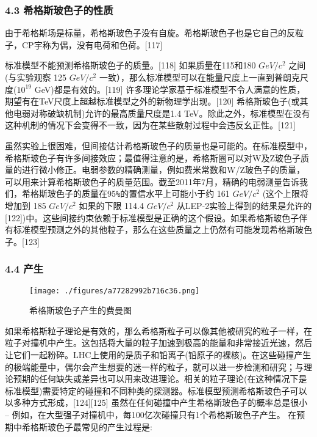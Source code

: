 \subsubsection{4.3 希格斯玻色子的性质}

由于希格斯场是标量，希格斯玻色子没有自旋。希格斯玻色子也是它自己的反粒子，CP宇称为偶，没有电荷和色荷。[117]

标准模型不能预测希格斯玻色子的质量。[118] 如果质量在115和180 $GeV/c^2$ 之间(与实验观察 125 $GeV/c^2$ 一致），那么标准模型可以在能量尺度上一直到普朗克尺度($10^{19}$ GeV)都是有效的。[119] 许多理论学家基于标准模型不令人满意的性质，期望有在TeV尺度上超越标准模型之外的新物理学出现。[120] 希格斯玻色子(或其他电弱对称破缺机制)允许的最高质量尺度是1.4 TeV。除此之外，标准模型在没有这种机制的情况下会变得不一致，因为在某些散射过程中会违反幺正性。[121]

虽然实验上很困难，但间接估计希格斯玻色子的质量也是可能的。在标准模型中，希格斯玻色子有许多间接效应；最值得注意的是，希格斯圈可以对W及Z玻色子质量的进行微小修正。电弱参数的精确测量，例如费米常数和W/Z玻色子的质量，可以用来计算希格斯玻色子的质量范围。截至2011年7月，精确的电弱测量告诉我们，希格斯玻色子的质量在95\verb|%|的置信水平上可能小于约 161 $GeV/c^2$ (这个上限将增加到 185 $GeV/c^2$ 如果的下限 114.4 $GeV/c^2$ 从LEP-2实验上得到的结果是允许的[122])中。这些间接约束依赖于标准模型是正确的这个假设。如果希格斯玻色子伴有标准模型预测之外的其他粒子，那么在这些质量之上仍然有可能发现希格斯玻色子。[123]

\subsubsection{4.4 产生}

\begin{figure}[ht]
\centering
\texttt{[image: ./figures/a77282992b716c36.png]}
\caption{希格斯玻色子产生的费曼图} \label{fig_Higgs_11}
\end{figure}

如果希格斯粒子理论是有效的，那么希格斯粒子可以像其他被研究的粒子一样，在粒子对撞机中产生。这包括将大量的粒子加速到极高的能量和非常接近光速，然后让它们一起粉碎。LHC上使用的是质子和铅离子(铅原子的裸核)。在这些碰撞产生的极端能量中，偶尔会产生想要的迷一样的粒子，就可以进一步检测和研究；与理论预期的任何缺失或差异也可以用来改进理论。相关的粒子理论(在这种情况下是标准模型)需要特定的碰撞和不同种类的探测器。标准模型预测希格斯玻色子可以以多种方式形成，[124][125] 虽然在任何碰撞中产生希格斯玻色子的概率总是很小 – 例如，在大型强子对撞机中，每100亿次碰撞只有1个希格斯玻色子产生。 在预期中希格斯玻色子最常见的产生过程是:

